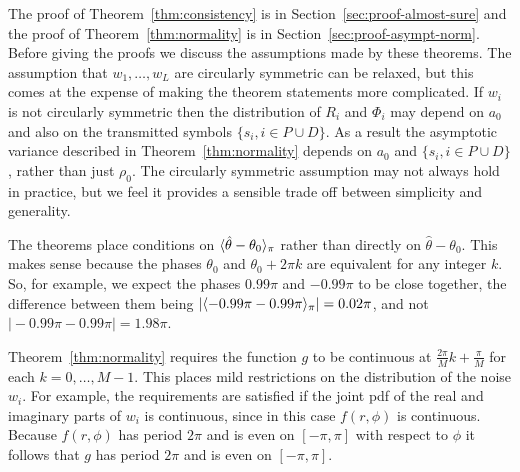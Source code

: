 \documentclass[journal]{IEEEtran}
\begin{document}
The proof of Theorem~\ref{thm:consistency} is in Section~\ref{sec:proof-almost-sure} and the proof of Theorem~\ref{thm:normality} is in Section~\ref{sec:proof-asympt-norm}.  Before giving the proofs we discuss the assumptions made by these theorems.  The assumption that $w_1, \dots, w_L$ are circularly symmetric can be relaxed, but this comes at the expense of making the theorem statements more complicated.  If $w_i$ is not circularly symmetric then the distribution of $R_i$ and $\Phi_i$ may depend on $a_0$ and also on the transmitted symbols $\{s_i,i \in P \cup D\}$.  As a result the asymptotic variance described in Theorem~\ref{thm:normality} depends on $a_0$ and $\{s_i,i \in P \cup D\}$, rather than just $\rho_0$.  The circularly symmetric assumption may not always hold in practice, but we feel it provides a sensible trade off between simplicity and generality.  


The theorems place conditions on $\langle \hat{\theta} - \theta_0 \rangle_\pi$ rather than directly on $\hat{\theta}  - \theta_0$.  This makes sense because the phases $\theta_0$ and $\theta_0 + 2\pi k$ are equivalent for any integer $k$. So, for example, we expect the phases $0.99\pi$ and $-0.99\pi$ to be close together, the difference between them being $\vert\langle -0.99\pi - 0.99\pi \rangle_\pi\vert = 0.02\pi$, and not $\vert -0.99\pi - 0.99\pi\vert = 1.98\pi$.

Theorem~\ref{thm:normality} requires the function $g$ to be continuous at $\tfrac{2\pi}{M}k + \tfrac{\pi}{M}$ for each $k = 0, \dots, M-1$.  This places mild restrictions on the distribution of the noise $w_i$.  For example, the requirements are satisfied if the joint pdf of the real and imaginary parts of $w_i$ is continuous, since in this case $f(r,\phi)$ is continuous.  Because $f(r,\phi)$ has period $2\pi$ and is even on $[-\pi,\pi]$ with respect to $\phi$ it follows that $g$ has period $2\pi$ and is even on $[-\pi, \pi]$.

\end{document}
